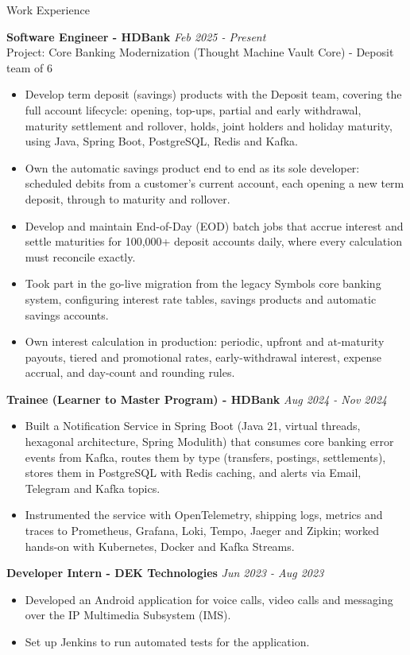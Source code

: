 \documentclass{resume} %
\begin{document}
\begin{rSection}{Work Experience}

    {\bf Software Engineer - HDBank} \hfill {\em Feb 2025 - Present}
    \\ Project: Core Banking Modernization (Thought Machine Vault Core) - Deposit team of 6

    \begin{itemize}
        \item Develop term deposit (savings) products with the Deposit team, covering the full account lifecycle: opening, top-ups, partial and early withdrawal, maturity settlement and rollover, holds, joint holders and holiday maturity, using Java, Spring Boot, PostgreSQL, Redis and Kafka.
        \item Own the automatic savings product end to end as its sole developer: scheduled debits from a customer's current account, each opening a new term deposit, through to maturity and rollover.
        \item Develop and maintain End-of-Day (EOD) batch jobs that accrue interest and settle maturities for 100,000+ deposit accounts daily, where every calculation must reconcile exactly.
        \item Took part in the go-live migration from the legacy Symbols core banking system, configuring interest rate tables, savings products and automatic savings accounts.
        \item Own interest calculation in production: periodic, upfront and at-maturity payouts, tiered and promotional rates, early-withdrawal interest, expense accrual, and day-count and rounding rules.
    \end{itemize}

    {\bf Trainee (Learner to Master Program) - HDBank} \hfill {\em Aug 2024 - Nov 2024}

    \begin{itemize}
        \item Built a Notification Service in Spring Boot (Java 21, virtual threads, hexagonal architecture, Spring Modulith) that consumes core banking error events from Kafka, routes them by type (transfers, postings, settlements), stores them in PostgreSQL with Redis caching, and alerts via Email, Telegram and Kafka topics.
        \item Instrumented the service with OpenTelemetry, shipping logs, metrics and traces to Prometheus, Grafana, Loki, Tempo, Jaeger and Zipkin; worked hands-on with Kubernetes, Docker and Kafka Streams.
    \end{itemize}

    {\bf Developer Intern - DEK Technologies} \hfill {\em Jun 2023 - Aug 2023}

    \begin{itemize}
        \item Developed an Android application for voice calls, video calls and messaging over the IP Multimedia Subsystem (IMS).
        \item Set up Jenkins to run automated tests for the application.
    \end{itemize}

\end{rSection}
\end{document}
